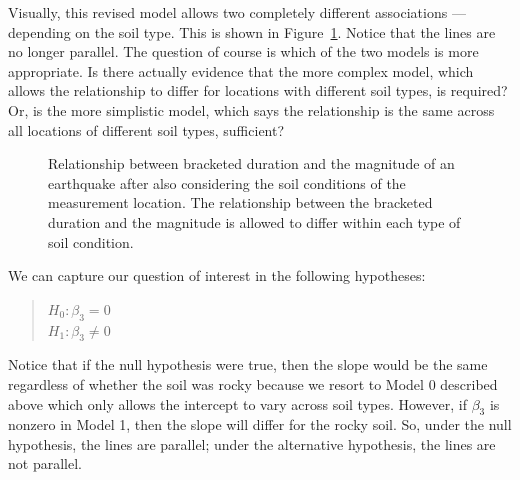 \documentclass[
  letterpaper,
  DIV=11,
  numbers=noendperiod]{scrreprt}
\theoremstyle{plain}
\theoremstyle{definition}
\theoremstyle{definition}
\theoremstyle{remark}
\begin{document}
Visually, this revised model allows two completely different
associations --- depending on the soil type. This is shown in
Figure~\ref{fig-regextensions-int-plot}. Notice that the lines are no
longer parallel. The question of course is which of the two models is
more appropriate. Is there actually evidence that the more complex
model, which allows the relationship to differ for locations with
different soil types, is required? Or, is the more simplistic model,
which says the relationship is the same across all locations of
different soil types, sufficient?

\begin{figure}


\caption{\label{fig-regextensions-int-plot}Relationship between
bracketed duration and the magnitude of an earthquake after also
considering the soil conditions of the measurement location. The
relationship between the bracketed duration and the magnitude is allowed
to differ within each type of soil condition.}

\end{figure}%

We can capture our question of interest in the following hypotheses:

\begin{quote}
\(H_0: \beta_3 = 0\)\\
\(H_1: \beta_3 \neq 0\)
\end{quote}

Notice that if the null hypothesis were true, then the slope would be
the same regardless of whether the soil was rocky because we resort to
Model 0 described above which only allows the intercept to vary across
soil types. However, if \(\beta_3\) is nonzero in Model 1, then the
slope will differ for the rocky soil. So, under the null hypothesis, the
lines are parallel; under the alternative hypothesis, the lines are not
parallel.
\end{document}
